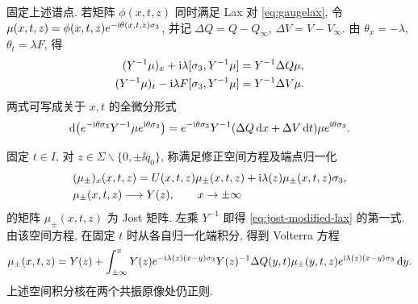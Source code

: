 固定上述谱点. 若矩阵 $\phi(x,t,z)$ 同时满足 Lax 对 \eqref{eq:gaugelax}, 令
$\mu(x,t,z)=\phi(x,t,z)e^{-\mathrm{i}\theta(x,t,z)\sigma_3}$,
并记 $\Delta Q=Q-Q_\infty$, $\Delta V=V-V_\infty$.
由 $\theta_x=-\lambda$, $\theta_t=\lambda F$, 得
\begin{equation}\label{eq:jost-modified-lax}
\begin{aligned}
(Y^{-1}\mu)_x+\mathrm{i}\lambda[\sigma_3,Y^{-1}\mu]&=Y^{-1}\Delta Q\mu,\\
(Y^{-1}\mu)_t-\mathrm{i}\lambda F[\sigma_3,Y^{-1}\mu]&=Y^{-1}\Delta V\mu.
\end{aligned}
\end{equation}
两式可写成关于 $x,t$ 的全微分形式
\begin{equation}\label{eq:jost-total-differential}
\mathrm{d}\!\left(e^{-\mathrm{i}\theta\sigma_3}Y^{-1}\mu e^{\mathrm{i}\theta\sigma_3}\right)
=e^{-\mathrm{i}\theta\sigma_3}Y^{-1}(\Delta Q\,\mathrm{d} x+\Delta V\,\mathrm{d} t)\mu e^{\mathrm{i}\theta\sigma_3}.
\end{equation}

固定 $t\in I$, 对 $z\in\Sigma\mathbin{\backslash}\{0,\pm\ii q_0\}$,
称满足修正空间方程及端点归一化
\begin{equation}\label{eq:jost-normalization}
\begin{aligned}
&(\mu_\pm)_x(x,t,z)=U(x,t,z)\mu_\pm(x,t,z)
+\mathrm{i}\lambda(z)\mu_\pm(x,t,z)\sigma_3,\\
&\mu_\pm(x,t,z)\longrightarrow Y(z),\qquad x\to\pm\infty
\end{aligned}
\end{equation}
的矩阵 $\mu_\pm(x,t,z)$ 为 Jost 矩阵.
左乘 $Y^{-1}$ 即得 \eqref{eq:jost-modified-lax} 的第一式.
由该空间方程, 在固定 $t$ 时从各自归一化端积分, 得到 Volterra 方程
\begin{equation}\label{eq:volterra}
\mu_\pm(x,t,z)=Y(z)+\int_{\pm\infty}^{x}
Y(z)e^{-\mathrm{i}\lambda(z)(x-y)\sigma_3}Y(z)^{-1}
\Delta Q(y,t)\mu_\pm(y,t,z)e^{\mathrm{i}\lambda(z)(x-y)\sigma_3}\,\mathrm{d} y.
\end{equation}
上述空间积分核在两个共振原像处仍正则.

